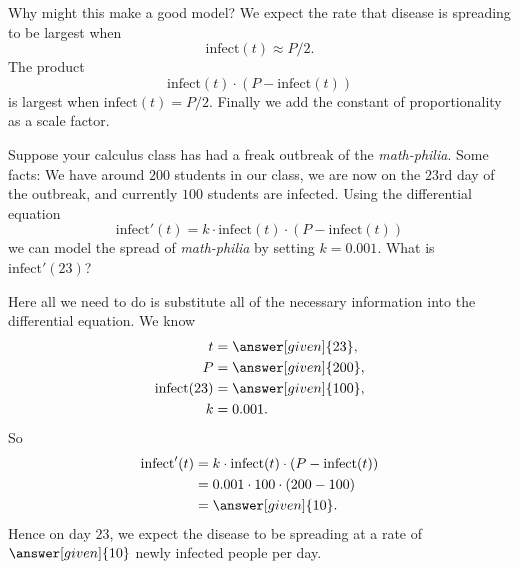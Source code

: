 \documentclass{ximera}
\begin{document}
Why might this make a good model? We expect the rate that
disease is spreading to be largest when
\[
\mathrm{infect}(t) \approx P/2.
\]
The product
\[
\mathrm{infect}(t)\cdot (P-\mathrm{infect}(t))
\]
is largest when $\mathrm{infect}(t) = P/2$. Finally we add the constant
of proportionality as a scale factor.




\begin{example}
  Suppose your calculus class has had a freak outbreak of the
  \textit{math-philia}. Some facts: We have around $200$ students in
  our class, we are now on the $23$rd day of the outbreak, and
  currently $100$ students are infected. Using the differential
  equation
  \[
  \mathrm{infect}'(t) = k\cdot \mathrm{infect}(t)\cdot (P-\mathrm{infect}(t))
  \]
  we can model the spread of \textit{math-philia} by setting $k=0.001$.
  What is $\mathrm{infect}'(23)$?

  \begin{explanation}
    Here all we need to do is substitute all of the necessary
    information into the differential equation. We know
    \begin{align*}
    t &= \answer[given]{23},\\
    P &= \answer[given]{200},\\
    \mathrm{infect}(23) &= \answer[given]{100},\\
    k&= 0.001.
    \end{align*}
    So
    \begin{align*}
      \mathrm{infect}'(t) &= k\cdot \mathrm{infect}(t)\cdot (P-\mathrm{infect}(t))\\
      &= 0.001\cdot 100\cdot(200-100)\\
      &=\answer[given]{10}.
    \end{align*}
    Hence on day $23$, we expect the disease to be spreading at a rate
    of $\answer[given]{10}$ newly infected people per day.
  \end{explanation}
\end{example}


\end{document}
